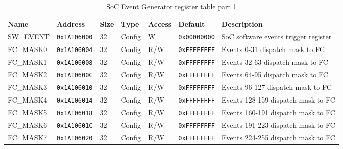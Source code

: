 \begin{table}[htbp]
  \small
\begin{tabularx}{\textwidth}{|l|l|l|l|l|l|X|}
  \hline
  \textbf{Name} & \textbf{Address}  & \textbf{Size} & \textbf{Type} & \textbf{Access} & \textbf{Default} & \textbf{Description} \\
  \hline
  SW\_EVENT & \texttt{0x1A106000} & 32 & Config & W      & \texttt{0x00000000} & SoC software events trigger register \\
  \hline
  FC\_MASK0 & \texttt{0x1A106004} & 32 & Config & R/W    & \texttt{0xFFFFFFFF} & Events 0-31 dispatch mask to FC \\
  \hline
  FC\_MASK1 & \texttt{0x1A106008} & 32 & Config & R/W    & \texttt{0xFFFFFFFF} & Events 32-63 dispatch mask to FC \\
  \hline
  FC\_MASK2 & \texttt{0x1A10600C} & 32 & Config & R/W    & \texttt{0xFFFFFFFF} & Events 64-95 dispatch mask to FC \\
  \hline
  FC\_MASK3 & \texttt{0x1A106010} & 32 & Config & R/W    & \texttt{0xFFFFFFFF} & Events 96-127 dispatch mask to FC \\
  \hline
  FC\_MASK4 & \texttt{0x1A106014} & 32 & Config & R/W    & \texttt{0xFFFFFFFF} & Events 128-159 dispatch mask to FC \\
  \hline
  FC\_MASK5 & \texttt{0x1A106018} & 32 & Config & R/W    & \texttt{0xFFFFFFFF} & Events 160-191 dispatch mask to FC \\
  \hline
  FC\_MASK6 & \texttt{0x1A10601C} & 32 & Config & R/W    & \texttt{0xFFFFFFFF} & Events 191-223 dispatch mask to FC \\
  \hline
  FC\_MASK7 & \texttt{0x1A106020} & 32 & Config & R/W    & \texttt{0xFFFFFFFF} & Events 224-255 dispatch mask to FC \\
  \hline

\end{tabularx}
\caption{SoC Event Generator register table part 1\label{tab:soc_eg_table0}}
\end{table}

